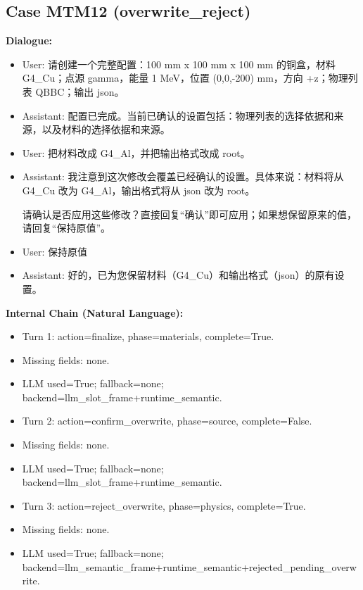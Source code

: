 \documentclass[11pt]{ctexart}
\begin{document}
\subsection{Case MTM12 (overwrite\_reject)}
\textbf{Dialogue:}
\begin{itemize}
\item User: 请创建一个完整配置：100 mm x 100 mm x 100 mm 的铜盒，材料 G4\_Cu；点源 gamma，能量 1 MeV，位置 (0,0,-200) mm，方向 +z；物理列表 QBBC；输出 json。
\item Assistant: 配置已完成。当前已确认的设置包括：物理列表的选择依据和来源，以及材料的选择依据和来源。
\item User: 把材料改成 G4\_Al，并把输出格式改成 root。
\item Assistant: 我注意到这次修改会覆盖已经确认的设置。具体来说：材料将从 G4\_Cu 改为 G4\_Al，输出格式将从 json 改为 root。

请确认是否应用这些修改？直接回复“确认”即可应用；如果想保留原来的值，请回复“保持原值”。
\item User: 保持原值
\item Assistant: 好的，已为您保留材料（G4\_Cu）和输出格式（json）的原有设置。
\end{itemize}
\textbf{Internal Chain (Natural Language):}
\begin{itemize}
\item Turn 1: action=finalize, phase=materials, complete=True.
\item Missing fields: none.
\item LLM used=True; fallback=none; backend=llm\_slot\_frame+runtime\_semantic.
\item Turn 2: action=confirm\_overwrite, phase=source, complete=False.
\item Missing fields: none.
\item LLM used=True; fallback=none; backend=llm\_slot\_frame+runtime\_semantic.
\item Turn 3: action=reject\_overwrite, phase=physics, complete=True.
\item Missing fields: none.
\item LLM used=True; fallback=none; backend=llm\_semantic\_frame+runtime\_semantic+rejected\_pending\_overwrite.
\end{itemize}
\end{document}
